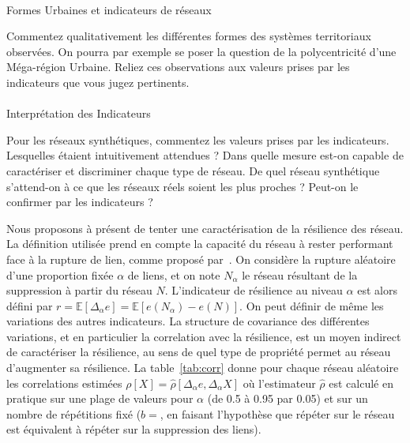 \paragraph{}{Formes Urbaines et indicateurs de réseaux}

Commentez qualitativement les différentes formes des systèmes territoriaux observées. On pourra par exemple se poser la question de la polycentricité d'une Méga-région Urbaine. Reliez ces observations aux valeurs prises par les indicateurs que vous jugez pertinents.

\paragraph{}{Interprétation des Indicateurs}

Pour les réseaux synthétiques, commentez les valeurs prises par les indicateurs. Lesquelles étaient intuitivement attendues ? Dans quelle mesure est-on capable de caractériser et discriminer chaque type de réseau. De quel réseau synthétique s'attend-on à ce que les réseaux réels soient les plus proches ? Peut-on le confirmer par les indicateurs ?


Nous proposons à présent de tenter une caractérisation de la résilience des réseau. La définition utilisée prend en compte la capacité du réseau à rester performant face à la rupture de lien, comme proposé par~\cite{ash2007optimizing}. On considère la rupture aléatoire d'une proportion fixée $\alpha$ de liens, et on note $N_{\alpha}$ le réseau résultant de la suppression à partir du réseau $N$. L'indicateur de résilience au niveau $\alpha$ est alors défini par $r = \mathbb{E} \left[\Delta_{\alpha} e \right] = \mathbb{E}\left[ e\left(N_{\alpha}\right) - e\left(N\right)\right]$. On peut définir de même les variations des autres indicateurs. La structure de covariance des différentes variations, et en particulier la correlation avec la résilience, est un moyen indirect de caractériser la résilience, au sens de quel type de propriété permet au réseau d'augmenter sa résilience. La table~\ref{tab:corr} donne pour chaque réseau aléatoire les correlations estimées $\rho\left[X\right] = \hat{\rho}\left[\Delta_{\alpha} e,\Delta_{\alpha} X\right]$ où l'estimateur $\hat{\rho}$ est calculé en pratique sur une plage de valeurs pour $\alpha$ (de 0.5 à 0.95 par 0.05) et sur un nombre de répétitions fixé ($b=$, en faisant l'hypothèse que répéter sur le réseau est équivalent à répéter sur la suppression des liens).


